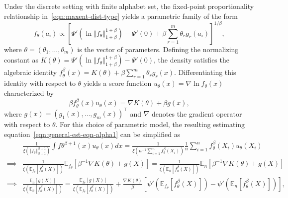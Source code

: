 \documentclass[11pt]{article}
\theoremstyle{plain}
\theoremstyle{remark}
\def\E{\mathbb{E}}
\newcommand{\norm}[1]{\left\Vert #1 \right\Vert}
\newcommand{\tr}{^{\intercal}}
\begin{document}
Under the discrete setting with finite alphabet set, the fixed-point proportionality relationship in~\eqref{eqn:maxent-dist-type} yields a parametric family of the form
\begin{equation}
    f_{\theta}(a_i) \propto \left[ \Psi'(\ln \norm{f_\theta}_{1+\beta}^{1 + \beta}) - \Psi'(0) + \beta \sum_{r=1}^m \theta_r g_r(a_i) \right]^{1/\beta},
    \label{eqn:maxent-dist-type1-alpha1}
\end{equation}
\noindent where $\theta = (\theta_1, \dots, \theta_m)$ is the vector of parameters. Defining the normalizing constant as $K(\theta) = \Psi'(\ln \norm{f_\theta}_{1+\beta}^{1+\beta}) - \Psi'(0)$, the density satisfies the algebraic identity $f_\theta^\beta(x) = K(\theta) + \beta \sum_{r=1}^m \theta_r g_r(x)$. Differentiating this identity with respect to $\theta$ yields a score function $u_\theta(x) = \nabla \ln f_\theta(x)$ characterized by
\begin{equation*}
    \beta f_\theta^\beta(x) u_\theta(x) = \nabla K(\theta) + \beta g(x),
\end{equation*}
\noindent where $g(x) = (g_1(x), \dots, g_m(x))\tr$ and $\nabla$ denotes the gradient operator with respect to $\theta$. For this choice of parametric model, the resulting estimating equation~\eqref{eqn:general-est-eqn-alpha1} can be simplified as
\begin{align}
             & \frac{1}{\xi(\norm{f_\theta}_{\beta+1}^{\beta+1})} \int f\theta^{\beta+1}(x) u_\theta(x) dx = \frac{1}{\xi(n^{-1}\sum_{i=1}^n f_\theta^\beta(X_i))} \frac{1}{n} \sum_{i=1}^n f_\theta^\beta(X_i) u_\theta(X_i) \nonumber                                                \\
    \implies & \frac{1}{\xi(\E_{f_\theta}[f_\theta^\beta(X)])} \E_{f_\theta}\left[ \beta^{-1}\nabla K(\theta) + g(X) \right] = \frac{1}{\xi(\E_n[f_\theta^\beta(X)])} \E_n\left[ \beta^{-1}\nabla K(\theta) + g(X) \right] \nonumber                                                   \\
    \implies & \frac{\E_n[g(X)]}{\xi(\E_n[f_\theta^\beta(X)])} = \frac{\E_{f_\theta}[g(X)]}{\xi(\E_{f_\theta}[f_\theta^\beta(X)])} + \frac{\nabla K(\theta)}{\beta} \left[ \psi'\left( \E_{f_\theta}[f_\theta^\beta(X)] \right) - \psi'\left( \E_n[f_\theta^\beta(X)] \right) \right],
    \label{eqn:projection-theorem-gmm}
\end{align}
\end{document}

